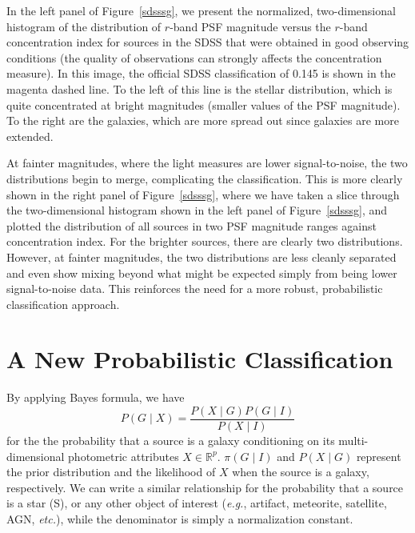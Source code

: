 In the left panel of Figure~\ref{sdsssg}, we present the normalized, two-dimensional histogram of the distribution of $r$-band PSF magnitude versus the $r$-band concentration index for sources in the SDSS that were obtained in good observing conditions (the quality of observations can strongly affects the concentration measure). In this image, the official SDSS classification of 0.145 is shown in the magenta dashed line. To the left of this line is the stellar distribution, which is quite concentrated at bright magnitudes (smaller values of the PSF magnitude). To the right are the galaxies, which are more spread out since galaxies are more extended. 


At fainter magnitudes, where the light measures are lower signal-to-noise, the two distributions begin to merge, complicating the classification. This is more clearly shown in the right panel of Figure~\ref{sdsssg}, where we have taken a slice through the two-dimensional histogram shown in the left panel of  Figure~\ref{sdsssg}, and plotted the distribution of all sources in two PSF magnitude ranges against concentration index. For the brighter sources, there are clearly two distributions. However, at fainter magnitudes, the two distributions are less cleanly separated and even show mixing beyond what might be expected simply from being lower signal-to-noise data. This reinforces the need for a more robust, probabilistic classification approach.

\section{A New Probabilistic Classification}

By applying Bayes formula, we have
\[ P(G \mid X) = \frac{P(X \mid G) P(G\mid I)}{P(X \mid I)}
\]
for the the probability that a source is a galaxy conditioning on its multi-dimensional photometric attributes $X \in \mathbb{R}^p$.  $\pi(G \mid I)$ and $P(X \mid G)$ represent the prior distribution and the likelihood of $X$ when the source is a galaxy, respectively. We can write a similar relationship for the probability that a source is a star (S), or any other object of interest (\textit{e.g.}, artifact, meteorite, satellite, AGN, \textit{etc.}), while the denominator is simply a normalization constant. %

